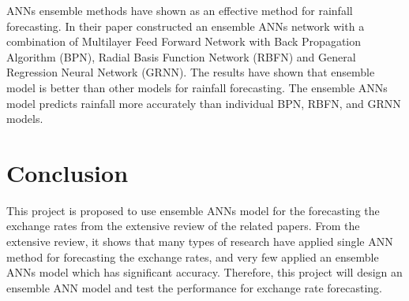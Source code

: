 ANNs ensemble methods have shown  as an effective method for rainfall forecasting. In their paper  constructed an ensemble ANNs network with a combination of Multilayer Feed Forward Network with Back Propagation Algorithm (BPN), Radial Basis Function Network (RBFN) and General Regression Neural Network (GRNN). The results have shown that ensemble model is better than other models for rainfall forecasting. The ensemble ANNs model predicts rainfall more accurately than individual BPN, RBFN, and GRNN models.

\section{Conclusion}
This project is proposed to use ensemble ANNs model for the forecasting the exchange rates from the extensive review of the related papers. From the extensive review, it shows that many types of research have applied single ANN method for forecasting the exchange rates, and very few applied an ensemble ANNs model which has significant accuracy. Therefore, this project will design an ensemble ANN model and test the performance for exchange rate forecasting.

